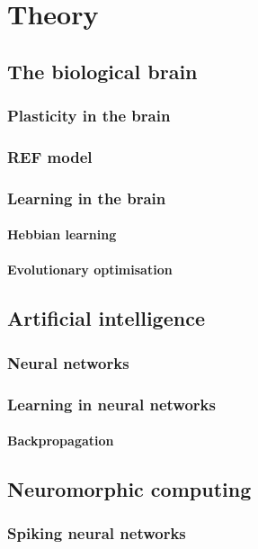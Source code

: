 \documentclass[a4paper,oneside]{memoir}
\begin{document}
\chapter{Theory}

  \section{The biological brain}
  \subsection{Plasticity in the brain}
  \subsection{REF model}

  \subsection{Learning in the brain}
  \subsubsection{Hebbian learning}
  \subsubsection{Evolutionary optimisation}

  \section{Artificial intelligence}
  \subsection{Neural networks}
  \subsection{Learning in neural networks}
  \subsubsection{Backpropagation}

  \section{Neuromorphic computing}
  \subsection{Spiking neural networks}
\end{document}
